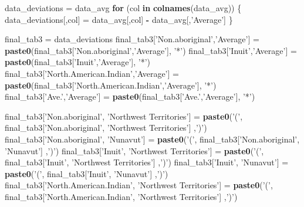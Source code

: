 \documentclass[9pt,letter]{article}
\newenvironment{Shaded}{\begin{snugshade}}{\end{snugshade}}
\newcommand{\KeywordTok}[1]{\textcolor[rgb]{0.13,0.29,0.53}{\textbf{#1}}}
\newcommand{\StringTok}[1]{\textcolor[rgb]{0.31,0.60,0.02}{#1}}
\newcommand{\ControlFlowTok}[1]{\textcolor[rgb]{0.13,0.29,0.53}{\textbf{#1}}}
\newcommand{\OperatorTok}[1]{\textcolor[rgb]{0.81,0.36,0.00}{\textbf{#1}}}
\newcommand{\NormalTok}[1]{#1}
\begin{document}
\begin{Shaded}
\begin{Highlighting}[]
\NormalTok{data_deviations =}\StringTok{ }\NormalTok{data_avg}
\ControlFlowTok{for}\NormalTok{ (col }\ControlFlowTok{in} \KeywordTok{colnames}\NormalTok{(data_avg)) \{}
\NormalTok{  data_deviations[,col] =}\StringTok{ }\NormalTok{data_avg[,col] }\OperatorTok{-}\StringTok{ }\NormalTok{data_avg[,}\StringTok{'Average'}\NormalTok{]}
\NormalTok{\}}

\NormalTok{final_tab3 =}\StringTok{ }\NormalTok{data_deviations}
\NormalTok{final_tab3[}\StringTok{'Non.aboriginal'}\NormalTok{,}\StringTok{'Average'}\NormalTok{] =}\StringTok{ }
\StringTok{  }\KeywordTok{paste0}\NormalTok{(final_tab3[}\StringTok{'Non.aboriginal'}\NormalTok{,}\StringTok{'Average'}\NormalTok{], }\StringTok{'*'}\NormalTok{)}
\NormalTok{final_tab3[}\StringTok{'Inuit'}\NormalTok{,}\StringTok{'Average'}\NormalTok{] =}\StringTok{ }
\StringTok{  }\KeywordTok{paste0}\NormalTok{(final_tab3[}\StringTok{'Inuit'}\NormalTok{,}\StringTok{'Average'}\NormalTok{], }\StringTok{'*'}\NormalTok{)}
\NormalTok{final_tab3[}\StringTok{'North.American.Indian'}\NormalTok{,}\StringTok{'Average'}\NormalTok{] =}\StringTok{ }
\StringTok{  }\KeywordTok{paste0}\NormalTok{(final_tab3[}\StringTok{'North.American.Indian'}\NormalTok{,}\StringTok{'Average'}\NormalTok{], }\StringTok{'*'}\NormalTok{)}
\NormalTok{final_tab3[}\StringTok{'Ave.'}\NormalTok{,}\StringTok{'Average'}\NormalTok{] =}\StringTok{ }
\StringTok{  }\KeywordTok{paste0}\NormalTok{(final_tab3[}\StringTok{'Ave.'}\NormalTok{,}\StringTok{'Average'}\NormalTok{], }\StringTok{'*'}\NormalTok{)}

\NormalTok{final_tab3[}\StringTok{'Non.aboriginal'}\NormalTok{, }\StringTok{'Northwest Territories'}\NormalTok{] =}\StringTok{ }
\StringTok{  }\KeywordTok{paste0}\NormalTok{(}\StringTok{'('}\NormalTok{, final_tab3[}\StringTok{'Non.aboriginal'}\NormalTok{, }\StringTok{'Northwest Territories'}\NormalTok{] ,}\StringTok{')'}\NormalTok{)}
\NormalTok{final_tab3[}\StringTok{'Non.aboriginal'}\NormalTok{, }\StringTok{'Nunavut'}\NormalTok{] =}\StringTok{ }
\StringTok{  }\KeywordTok{paste0}\NormalTok{(}\StringTok{'('}\NormalTok{, final_tab3[}\StringTok{'Non.aboriginal'}\NormalTok{, }\StringTok{'Nunavut'}\NormalTok{] ,}\StringTok{')'}\NormalTok{)}
\NormalTok{final_tab3[}\StringTok{'Inuit'}\NormalTok{, }\StringTok{'Northwest Territories'}\NormalTok{] =}\StringTok{ }
\StringTok{  }\KeywordTok{paste0}\NormalTok{(}\StringTok{'('}\NormalTok{, final_tab3[}\StringTok{'Inuit'}\NormalTok{, }\StringTok{'Northwest Territories'}\NormalTok{] ,}\StringTok{')'}\NormalTok{)}
\NormalTok{final_tab3[}\StringTok{'Inuit'}\NormalTok{, }\StringTok{'Nunavut'}\NormalTok{] =}\StringTok{ }
\StringTok{  }\KeywordTok{paste0}\NormalTok{(}\StringTok{'('}\NormalTok{, final_tab3[}\StringTok{'Inuit'}\NormalTok{, }\StringTok{'Nunavut'}\NormalTok{] ,}\StringTok{')'}\NormalTok{)}
\NormalTok{final_tab3[}\StringTok{'North.American.Indian'}\NormalTok{, }\StringTok{'Northwest Territories'}\NormalTok{] =}\StringTok{ }
\StringTok{  }\KeywordTok{paste0}\NormalTok{(}\StringTok{'('}\NormalTok{, final_tab3[}\StringTok{'North.American.Indian'}\NormalTok{, }\StringTok{'Northwest Territories'}\NormalTok{] ,}\StringTok{')'}\NormalTok{)}


\end{Highlighting}
\end{Shaded}
\end{document}
